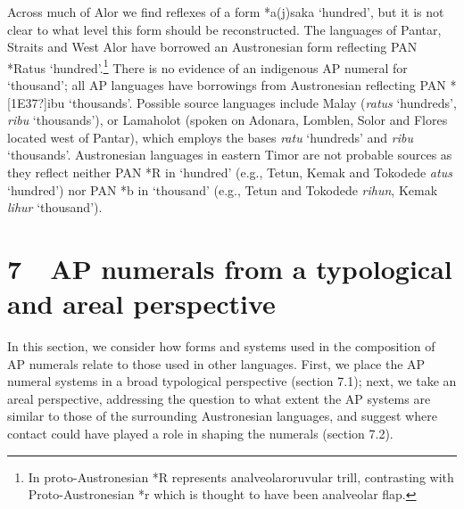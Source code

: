 Across much of Alor we find reflexes of a form *a(j)saka {\textquoteleft}hundred{\textquoteright}, but it is not clear to what level this form should be reconstructed. The languages of Pantar, Straits and West Alor have borrowed an Austronesian form reflecting PAN *Ratus {\textquoteleft}hundred{\textquoteright}.\footnote{In proto-Austronesian *R represents an\textstyleappleconvertedspace{~}alveolar\textstyleappleconvertedspace{~}or\textstyleappleconvertedspace{~}uvular trill, contrasting with Proto-Austronesian *r which is thought to have been an\textstyleappleconvertedspace{~}alveolar flap.} There is no evidence of an indigenous AP numeral for {\textquoteleft}thousand{\textquoteright}; all AP languages have borrowings from Austronesian reflecting PAN *[1E37?]ibu {\textquoteleft}thousands{\textquoteright}. Possible source languages include Malay (\textit{ratus }{\textquoteleft}hundreds{\textquoteright}, \textit{ribu }{\textquoteleft}thousands{\textquoteright}), or Lamaholot (spoken on Adonara, Lomblen, Solor 
and Flores located west of Pantar), which employs the bases \textit{ratu }{\textquoteleft}hundreds{\textquoteright} and \textit{ribu }{\textquoteleft}thousands{\textquoteright}. Austronesian languages in eastern Timor are not probable sources as they reflect neither PAN *R in {\textquoteleft}hundred{\textquoteright} (e.g., Tetun, Kemak and Tokodede \textit{atus }{\textquoteleft}hundred{\textquoteright}) nor PAN *b in {\textquoteleft}thousand{\textquoteright} (e.g., Tetun and Tokodede \textit{rihun}, Kemak \textit{lihur }{\textquoteleft}thousand{\textquoteright}).

\section[7\ \ AP numerals from a typological and areal perspective ]{7\ \ AP numerals from a typological and areal perspective }
In this section, we consider how forms and systems used in the composition of AP numerals relate to those used in other languages. First, we place the AP numeral systems in a broad typological perspective (section 7.1); next, we take an areal perspective, addressing the question to what extent the AP systems are similar to those of the surrounding Austronesian languages, and suggest where contact could have played a role in shaping the numerals (section 7.2).


